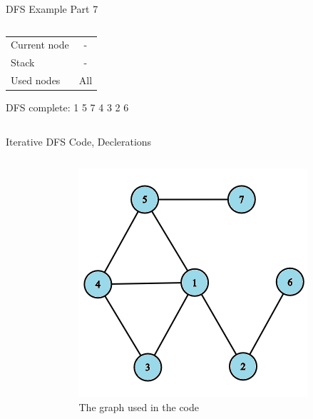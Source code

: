 \documentclass[aspectratio=169]{beamer}%
\begin{document}
\begin{frame}{DFS Example Part 7}
\begin{columns}
\begin{column}{0.32\textwidth}
\begin{figure}[!ht]
            \end{figure}
            \begin{table}[ht]
                \centering
                \begin{tabular}{l c}
                    Current node & -\\
                    Stack & -\\ 
                    Used nodes & All\\
                \end{tabular}
            \end{table}
            DFS complete: 1 5 7 4 3 2 6
        \end{column}
    \end{columns}
\end{frame}

\begin{frame}{Iterative DFS Code, Declerations}
    \begin{columns}
        \begin{column}{0.70\textwidth}
            
        \end{column}
        \hfill
        \begin{column}{0.25\textwidth}
            \begin{figure}
                \centering
                \includegraphics[width = .9\linewidth]{dfs 21.png}
                \caption{The graph used in the code}
            \end{figure}
        \end{column}
    \end{columns}
\end{frame}
\end{document}
